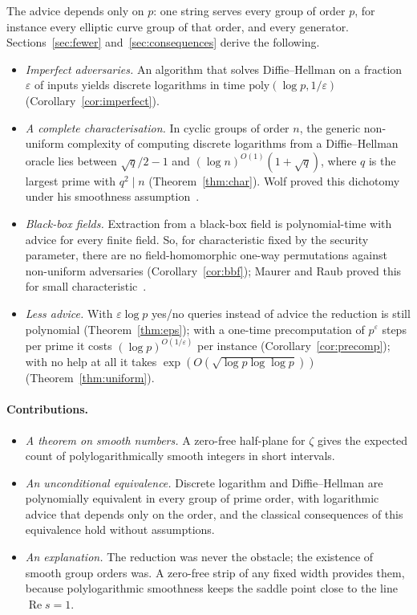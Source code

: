 \documentclass[11pt]{article}
\theoremstyle{remark}
\begin{document}
The advice depends only on $p$: one string serves every group of order $p$, for instance every elliptic
curve group of that order, and every generator. Sections~\ref{sec:fewer} and~\ref{sec:consequences} derive
the following.
\begin{itemize}
\item \emph{Imperfect adversaries.} An algorithm that solves Diffie--Hellman on a fraction $\varepsilon$ of
  inputs yields discrete logarithms in time $\mathrm{poly}(\log p,1/\varepsilon)$
  (Corollary~\ref{cor:imperfect}).
\item \emph{A complete characterisation.} In cyclic groups of order $n$, the generic non-uniform complexity
  of computing discrete logarithms from a Diffie--Hellman oracle lies between $\sqrt q/2-1$ and
  $(\log n)^{O(1)}(1+\sqrt q)$, where $q$ is the largest prime with $q^2\mid n$
  (Theorem~\ref{thm:char}). Wolf proved this dichotomy under his smoothness assumption~\cite{Wol99}.
\item \emph{Black-box fields.} Extraction from a black-box field is polynomial-time with advice for every
  finite field. So, for characteristic fixed by the security parameter, there are no field-homomorphic
  one-way permutations against non-uniform adversaries (Corollary~\ref{cor:bbf}); Maurer and Raub proved
  this for small characteristic~\cite{MR07}.
\item \emph{Less advice.} With $\varepsilon\log p$ yes/no queries instead of advice the reduction is still
  polynomial (Theorem~\ref{thm:eps}); with a one-time precomputation of $p^{\varepsilon}$ steps per prime it
  costs $(\log p)^{O(1/\varepsilon)}$ per instance (Corollary~\ref{cor:precomp}); with no help at all it takes
  $\exp(O(\sqrt{\log p\log\log p}))$ (Theorem~\ref{thm:uniform}).
\end{itemize}

\paragraph{Contributions.}
\begin{itemize}
\item \emph{A theorem on smooth numbers.} A zero-free half-plane for $\zeta$ gives the expected count of
  polylogarithmically smooth integers in short intervals.
\item \emph{An unconditional equivalence.} Discrete logarithm and Diffie--Hellman are polynomially
  equivalent in every group of prime order, with logarithmic advice that depends only on the order, and the
  classical consequences of this equivalence hold without assumptions.
\item \emph{An explanation.} The reduction was never the obstacle; the existence of smooth group orders was.
  A zero-free strip of any fixed width provides them, because polylogarithmic smoothness keeps the saddle
  point close to the line $\operatorname{Re}s=1$.
\end{itemize}
\end{document}
